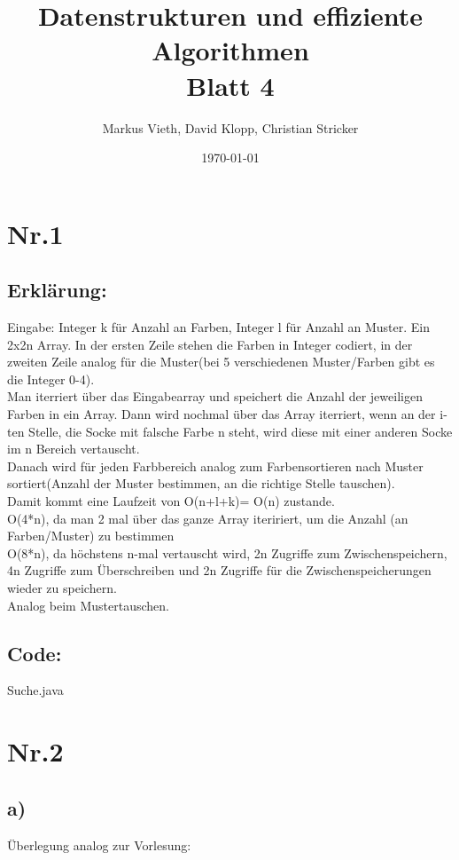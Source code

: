\documentclass[a4paper,11pt,twoside]{article}
\title{Datenstrukturen und effiziente Algorithmen\\ Blatt 4}
\author{Markus Vieth, David Klopp, Christian Stricker}
\date{\today}
\begin{document}
\maketitle
\cleardoublepage
\pagestyle{myheadings}

\section*{Nr.1}
\subsection*{Erklärung:}
Eingabe: Integer k für Anzahl an Farben, Integer l für Anzahl an Muster. Ein 2x2n Array. In der ersten Zeile stehen die Farben in Integer codiert, in der zweiten Zeile analog für die Muster(bei 5 verschiedenen Muster/Farben gibt es die Integer 0-4).\\
Man iterriert über das Eingabearray und speichert die Anzahl der jeweiligen Farben in ein Array. Dann wird nochmal über das Array iterriert, wenn an der i-ten Stelle, die Socke mit falsche Farbe n steht, wird diese mit einer anderen Socke im n Bereich vertauscht.\\
Danach wird für jeden Farbbereich analog zum Farbensortieren nach Muster sortiert(Anzahl der Muster bestimmen, an die richtige Stelle tauschen).\\
Damit kommt eine Laufzeit von O(n+l+k)= O(n) zustande.\\
O(4*n), da man 2 mal über das ganze Array iteririert, um die Anzahl (an Farben/Muster) zu bestimmen\\
O(8*n), da höchstens n-mal vertauscht wird, 2n Zugriffe zum Zwischenspeichern, 4n Zugriffe zum Überschreiben und 2n Zugriffe für die Zwischenspeicherungen wieder zu speichern.\\
Analog beim Mustertauschen.\\

\subsection*{Code:}
 {Suche.java}


\section*{Nr.2}
\subsection*{a)}
Überlegung analog zur Vorlesung:\\
\end{document}
